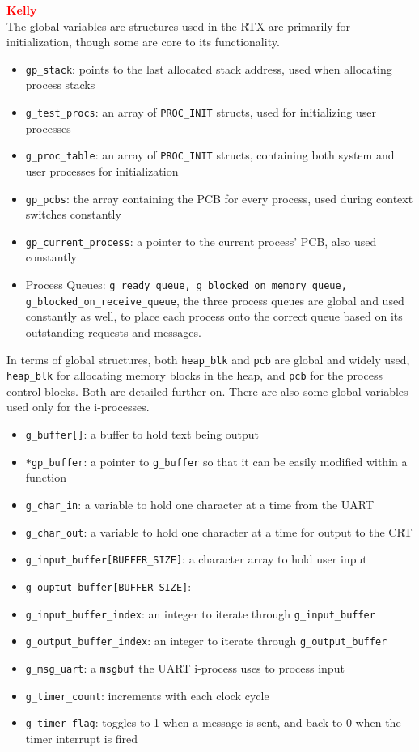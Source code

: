 \documentclass[12pt]{report}
\begin{document}
\textcolor{red}{\textbf{Kelly}} \\
The global variables are structures used in the RTX are primarily for initialization, though
some are core to its functionality.
\begin{itemize}
	\item \texttt{gp\_stack}: points to the last allocated stack address, used when allocating process stacks
	\item \texttt{g\_test\_procs}: an array of \texttt{PROC\_INIT} structs, used for initializing user processes
	\item \texttt{g\_proc\_table}: an array of \texttt{PROC\_INIT} structs, containing both system and user processes for initialization
	\item \texttt{gp\_pcbs}: the array containing the PCB for every process, used during context switches constantly
	\item \texttt{gp\_current\_process}: a pointer to the current process' PCB, also used constantly
	\item Process Queues: \texttt{g\_ready\_queue, g\_blocked\_on\_memory\_queue, g_blocked_on_receive_queue},
		the three process queues are global and used constantly as well, to place each process
		onto the correct queue based on its outstanding requests and messages.
\end{itemize}
In terms of global structures, both \texttt{heap\_blk} and \texttt{pcb} are global
and widely used, \texttt{heap\_blk} for allocating memory blocks in the heap, and
\texttt{pcb} for the process control blocks. Both are detailed further on.
There are also some global variables used only for the i-processes.
\begin{itemize}
	\item \texttt{g\_buffer[]}: a buffer to hold text being output
	\item \texttt{*gp\_buffer}: a pointer to \texttt{g\_buffer} so that it can be easily modified within a function
	\item \texttt{g\_char\_in}: a variable to hold one character at a time from the UART
	\item \texttt{g\_char\_out}: a variable to hold one character at a time for output to the CRT
	\item \texttt{g\_input\_buffer[BUFFER\_SIZE]}: a character array to hold user input
	\item \texttt{g\_ouptut\_buffer[BUFFER\_SIZE]}:
	\item \texttt{g\_input\_buffer\_index}: an integer to iterate through \texttt{g\_input\_buffer}
	\item \texttt{g\_output\_buffer\_index}: an integer to iterate through \texttt{g\_output\_buffer}
	\item \texttt{g\_msg\_uart}: a \texttt{msgbuf} the UART i-process uses to process input
	\item \texttt{g\_timer\_count}: increments with each clock cycle
	\item \texttt{g\_timer\_flag}: toggles to 1 when a message is sent, and back to 0 when the timer interrupt is fired
\end{itemize}
\end{document}

